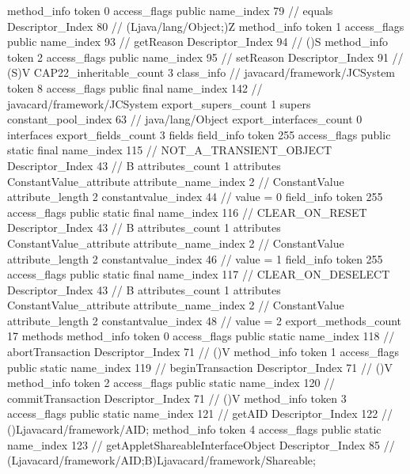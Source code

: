 {{{{{				}
				method_info {
					token	0
					access_flags	public
					name_index	79		// equals
					Descriptor_Index	80		// (Ljava/lang/Object;)Z
				}
				method_info {
					token	1
					access_flags	public
					name_index	93		// getReason
					Descriptor_Index	94		// ()S
				}
				method_info {
					token	2
					access_flags	public
					name_index	95		// setReason
					Descriptor_Index	91		// (S)V
				}
			}
			CAP22_inheritable_count	3
		}
		class_info {		// javacard/framework/JCSystem
			token	8
			access_flags	public final
			name_index	142		// javacard/framework/JCSystem
			export_supers_count	1
			supers {
				constant_pool_index	63		// java/lang/Object
			}
			export_interfaces_count	0
			interfaces {
			}
			export_fields_count	3
			fields {
			field_info {
				token	255
				access_flags	public static final
				name_index	115		// NOT_A_TRANSIENT_OBJECT
				Descriptor_Index	43		// B
				attributes_count	1
				attributes {
				ConstantValue_attribute {
					attribute_name_index	2		// ConstantValue
					attribute_length	2
					constantvalue_index	44		// value = 0
				}
				}
			}
			field_info {
				token	255
				access_flags	public static final
				name_index	116		// CLEAR_ON_RESET
				Descriptor_Index	43		// B
				attributes_count	1
				attributes {
				ConstantValue_attribute {
					attribute_name_index	2		// ConstantValue
					attribute_length	2
					constantvalue_index	46		// value = 1
				}
				}
			}
			field_info {
				token	255
				access_flags	public static final
				name_index	117		// CLEAR_ON_DESELECT
				Descriptor_Index	43		// B
				attributes_count	1
				attributes {
				ConstantValue_attribute {
					attribute_name_index	2		// ConstantValue
					attribute_length	2
					constantvalue_index	48		// value = 2
				}
				}
			}
			}
			export_methods_count	17
			methods {
				method_info {
					token	0
					access_flags	public static
					name_index	118		// abortTransaction
					Descriptor_Index	71		// ()V
				}
				method_info {
					token	1
					access_flags	public static
					name_index	119		// beginTransaction
					Descriptor_Index	71		// ()V
				}
				method_info {
					token	2
					access_flags	public static
					name_index	120		// commitTransaction
					Descriptor_Index	71		// ()V
				}
				method_info {
					token	3
					access_flags	public static
					name_index	121		// getAID
					Descriptor_Index	122		// ()Ljavacard/framework/AID;
				}
				method_info {
					token	4
					access_flags	public static
					name_index	123		// getAppletShareableInterfaceObject
					Descriptor_Index	85		// (Ljavacard/framework/AID;B)Ljavacard/framework/Shareable;
}}}}}
